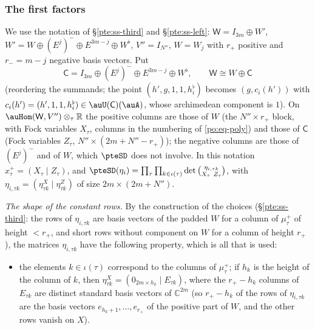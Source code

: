 \documentclass[10pt]{amsart}
\theoremstyle{definition}
\theoremstyle{remark}
\newcommand{\C}{\mathbb C}
\newcommand{\R}{\mathbb R}
\begin{document}
\subsubsection{The first factors}\label{ptf:ss-ff}

We use the notation of \S\ref{pte:ss-third} and \S\ref{pte:ss-left}: $\mathsf W=I_{3m}\oplus W'$,
$W'=W\oplus(E^j)^-\oplus E^{3m-j}\oplus W^\flat$, $V''=I_{N''}$, $W=W_j$ with $r_+$ positive and $r_-=m-j$
negative basis vectors. Put
\[
\mathsf C=I_{3m}\oplus(E^j)^-\oplus E^{3m-j}\oplus W^\flat,\qquad \mathsf W\cong W\oplus\mathsf C
\]
(reordering the summands; the point $(h',g,1,1,h^\flat_i)$ becomes $(g,c_i(h'))$ with
$c_i(h')=(h',1,1,h^\flat_i)\in\auU(\mathsf C)(\auA)$, whose archimedean component is $1$). On
$\auHom(\mathsf W,V'')\otimes_\tau\R$ the positive columns are those of $W$ (the $N''\times r_+$ block, with
Fock variables $X_\tau$, columns in the numbering of \eqref{po:eq-poly}) and those of $\mathsf C$ (Fock
variables $Z_\tau$, $N''\times(2m+N''-r_+)$); the negative columns are those of $(E^j)^-$ and of $W$, which
$\pteSD$ does not involve. In this notation $x^+_\tau=(X_\tau\mid Z_\tau)$, and $\pteSD(\eta_i)=\prod_\tau\prod_{k\in
\iota(\tau)}\det\binom{\eta_{i,\tau k}}{X_\tau\ Z_\tau}$, with $\eta_{i,\tau k}=(\eta^X_{\tau k}\mid\eta^Z_{\tau k})$ of size
$2m\times(2m+N'')$.

\emph{The shape of the constant rows.} By the construction of the choices (\S\ref{pte:ss-third}: the rows of
$\eta_{i,\tau k}$ are basis vectors of the padded $W$ for a column of $\mu^+_\tau$ of height $<r_+$, and
short rows without component on $W$ for a column of height $r_+$), the matrices $\eta_{i,\tau k}$ have the
following property, which is all that is used:
\begin{itemize}
\item[(H)] the elements $k\in\iota(\tau)$ correspond to the columns of $\mu^+_\tau$; if $h_k$ is the height of
the column of $k$, then $\eta^X_{\tau k}=(0_{2m\times h_k}\mid E_{\tau k})$, where the $r_+-h_k$ columns of
$E_{\tau k}$ are distinct standard basis vectors of $\C^{2m}$ (so $r_+-h_k$ of the rows of $\eta_{i,\tau k}$ are the
basis vectors $e_{h_k+1},\dots,e_{r_+}$ of the positive part of $W$, and the other rows vanish on $X$).
\end{itemize}
\end{document}
